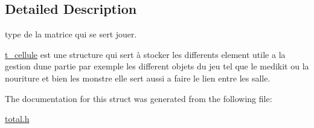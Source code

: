 \subsection{Detailed Description}
type de la matrice qui se sert jouer. 

\hyperlink{structt__cellule}{t\+\_\+cellule} est une structure qui sert à stocker les differents element utile a la gestion d\textquotesingle{}une partie par exemple les different objets du jeu tel que le medikit ou la nouriture et bien les monstre elle sert aussi a faire le lien entre les salle. 

The documentation for this struct was generated from the following file\+:\begin{DoxyCompactItemize}
\item 
\hyperlink{total_8h}{total.\+h}\end{DoxyCompactItemize}
